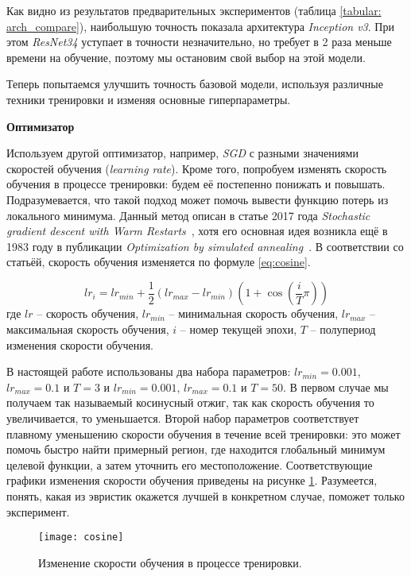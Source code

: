\indent
\indent
Как видно из результатов предварительных экспериментов
(таблица \ref{tabular: arch_compare}), наибольшую
точность показала архитектура \textit{Inception v3}. При этом 
\textit{ResNet34} уступает в точности незначительно, но требует
в 2 раза меньше времени на обучение, поэтому мы остановим свой
выбор на этой модели. 


Теперь попытаемся улучшить точность базовой модели,
используя различные техники тренировки и изменяя основные гиперпараметры.

\indent
\textbf{Оптимизатор}

\indent
Используем другой оптимизатор, например, \textit{SGD} с 
разными значениями скоростей обучения (\textit{learning rate}).
Кроме того, попробуем изменять скорость обучения в процессе тренировки:
будем её постепенно понижать и повышать.
Подразумевается, что такой подход может
помочь вывести функцию потерь из локального минимума. Данный
метод описан в статье 2017 года
\textit{Stochastic gradient descent with Warm Restarts}~\cite{cosine},
хотя его основная идея возникла ещё в 1983 году в публикации
\textit{Optimization by simulated annealing}~\cite{annealing}. В соответствии со
статьёй, скорость обучения изменяется по формуле \ref{eq:cosine}.

\begin{equation}\label{eq:cosine}
    lr_i = lr_{min} + \frac{1}{2} (lr_{max} - lr_{min}) (1 + \cos(\frac{i}{T} \pi ))
\end{equation}
где $lr$ -- скорость обучения,
$lr_{min}$ -- минимальная скорость обучения,
$lr_{max}$ -- максимальная скорость обучения,
$i$ -- номер текущей эпохи,
$T$ -- полупериод изменения скорости обучения. 

\indent
В настоящей работе использованы два набора параметров:
$lr_{min} = 0.001$, $lr_{max} = 0.1$ и $T = 3$ и
$lr_{min} = 0.001$, $lr_{max} = 0.1$ и $T = 50$. 
В первом случае мы получаем так называемый косинусный отжиг,
так как скорость обучения то увеличивается, то уменьшается.
Второй набор параметров соответствует плавному
уменьшению скорости обучения в течение всей тренировки:
это может помочь быстро найти примерный регион,
где находится глобальный
минимум целевой функции, а затем уточнить его местоположение.
Соответствующие графики изменения
скорости обучения приведены на рисунке \ref{tikzpicture: cosine}.
Разумеется, понять,
какая из эвристик окажется лучшей в конкретном случае, поможет
только эксперимент.


\begin{figure}[h]
    \begin{center}
   	    \texttt{[image: cosine]}
   	\end{center}
   	\caption{Изменение скорости обучения в процессе тренировки.}
   	\label{tikzpicture: cosine}
\end{figure}


